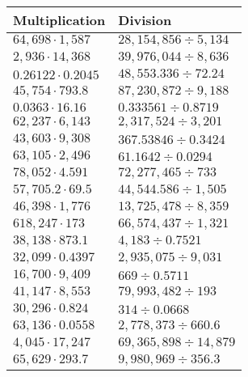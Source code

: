 \begin{longtable}[]{@{}ll@{}}
\toprule
Multiplication & Division\tabularnewline
\midrule
\endhead
\(64,698\cdot1,587\) & \(28,154,856÷5,134\)\tabularnewline
\(2,936\cdot 14,368\) & \(39,976,044÷8,636\)\tabularnewline
\(0.26122\cdot0.2045\) & \(48,553.336÷72.24\)\tabularnewline
\(45,754\cdot793.8\) & \(87,230,872÷9,188\)\tabularnewline
\(0.0363\cdot16.16\) & \(0.333561÷0.8719\)\tabularnewline
\(62,237\cdot6,143\) & \(2,317,524÷3,201\)\tabularnewline
\(43,603\cdot9,308\) & \(367.53846÷0.3424\)\tabularnewline
\(63,105\cdot2,496\) & \(61.1642÷0.0294\)\tabularnewline
\(78,052\cdot4.591\) & \(72,277,465÷733\)\tabularnewline
\(57,705.2\cdot69.5\) & \(44,544.586÷1,505\)\tabularnewline
\(46,398\cdot1,776\) & \(13,725,478÷8,359\)\tabularnewline
\(618,247\cdot173\) & \(66,574,437÷1,321\)\tabularnewline
\(38,138\cdot873.1\) & \(4,183÷0.7521\)\tabularnewline
\(32,099\cdot0.4397\) & \(2,935,075÷9,031\)\tabularnewline
\(16,700\cdot9,409\) & \(669÷0.5711\)\tabularnewline
\(41,147\cdot8,553\) & \(79,993,482÷193\)\tabularnewline
\(30,296\cdot0.824\) & \(314÷0.0668\)\tabularnewline
\(63,136\cdot0.0558\) & \(2,778,373÷660.6\)\tabularnewline
\(4,045\cdot17,247\) & \(69,365,898÷14,879\)\tabularnewline
\(65,629\cdot293.7\) & \(9,980,969÷356.3\)\tabularnewline
\bottomrule
\end{longtable}
